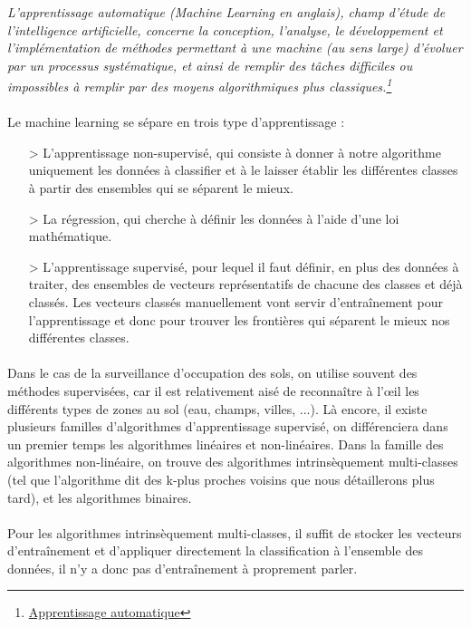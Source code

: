 \textit{L'apprentissage automatique (Machine Learning en anglais), champ d'étude de l'intelligence artificielle, concerne la conception, l'analyse, le développement et l'implémentation de méthodes permettant à une machine (au sens large) d'évoluer par un processus systématique, et ainsi de remplir des tâches difficiles ou impossibles à remplir par des moyens algorithmiques plus classiques.\footnote{\href{https://fr.wikipedia.org/wiki/Apprentissage_automatique}{Apprentissage automatique}}}

\paragraph{}
Le machine learning se sépare en trois type d'apprentissage :
\begin{itemize}
  \item[>] L'apprentissage non-supervisé, qui consiste à donner à notre algorithme uniquement les données à classifier et à le laisser établir les différentes classes à partir des ensembles qui se séparent le mieux.
  \item[>] La régression, qui cherche à définir les données à l'aide d'une loi mathématique.
  \item[>] L'apprentissage supervisé, pour lequel il faut définir, en plus des données à traiter, des ensembles de vecteurs représentatifs de chacune des classes et déjà classés. Les vecteurs classés manuellement vont servir d'entraînement pour l'apprentissage et donc pour trouver les frontières qui séparent le mieux nos différentes classes.
\end{itemize}

\paragraph{}
Dans le cas de la surveillance d'occupation des sols, on utilise souvent des méthodes supervisées, car il est relativement aisé de reconnaître à l'œil les différents types de zones au sol (eau, champs, villes, ...). Là encore, il existe plusieurs familles d'algorithmes d'apprentissage supervisé, on différenciera dans un premier temps les algorithmes linéaires et non-linéaires. Dans la famille des algorithmes non-linéaire, on trouve des algorithmes intrinsèquement multi-classes (tel que l'algorithme dit des k-plus proches voisins que nous détaillerons plus tard), et les algorithmes binaires.
\paragraph{}
Pour les algorithmes intrinsèquement multi-classes, il suffit de stocker les vecteurs d'entraînement et d'appliquer directement la classification à l'ensemble des données, il n'y a donc pas d'entraînement à proprement parler.
